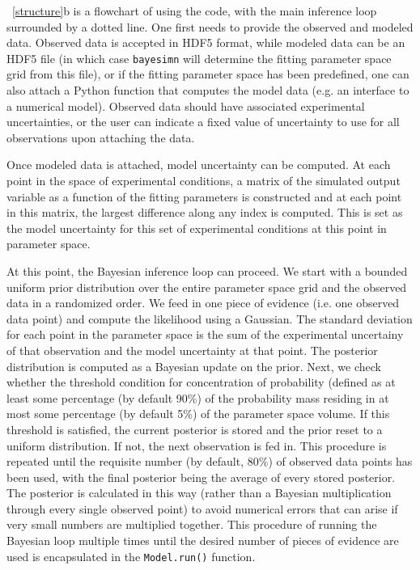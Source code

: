 \documentclass[aps,prl,amsmath,amssymb,superscriptaddress,notitlepage,groupedaddress]{revtex4-1}
\begin{document}
  ~\autoref{structure}b is a flowchart of using the code, with the main inference loop surrounded by a dotted line. One first needs to provide the observed and modeled data. Observed data is accepted in HDF5 format, while modeled data can be an HDF5 file (in which case \texttt{bayesimn} will determine the fitting parameter space grid from this file), or if the fitting parameter space has been predefined, one can also attach a Python function that computes the model data (e.g. an interface to a numerical model). Observed data should have associated experimental uncertainties, or the user can indicate a fixed value of uncertainty to use for all observations upon attaching the data.

  Once modeled data is attached, model uncertainty can be computed. At each point in the space of experimental conditions, a matrix of the simulated output variable as a function of the fitting parameters is constructed and at each point in this matrix, the largest difference along any index is computed. This is set as the model uncertainty for this set of experimental conditions at this point in parameter space.

  At this point, the Bayesian inference loop can proceed. We start with a bounded uniform prior distribution over the entire parameter space grid and the observed data in a randomized order. We feed in one piece of evidence (i.e. one observed data point) and compute the likelihood using a Gaussian. The standard deviation for each point in the parameter space is the sum of the experimental uncertainy of that observation and the model uncertainty at that point. The posterior distribution is computed as a Bayesian update on the prior. Next, we check whether the threshold condition for concentration of probability (defined as at least some percentage (by default 90\%) of the probability mass residing in at most some percentage (by default 5\%) of the parameter space volume. If this threshold is satisfied, the current posterior is stored and the prior reset to a uniform distribution. If not, the next observation is fed in. This procedure is repeated until the requisite number (by default, 80\%) of observed data points has been used, with the final posterior being the average of every stored posterior. The posterior is calculated in this way (rather than a Bayesian multiplication through every single observed point) to avoid numerical errors that can arise if very small numbers are multiplied together. This procedure of running the Bayesian loop multiple times until the desired number of pieces of evidence are used is encapsulated in the \texttt{Model.run()} function.
\end{document}
